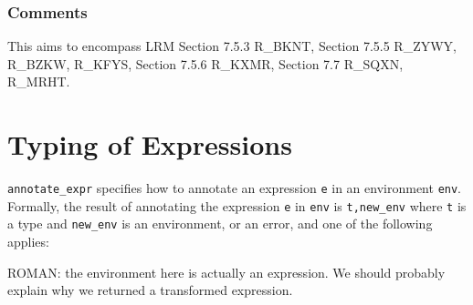 \documentclass{book}
\begin{document}
\subsection{Comments}
  This aims to encompass LRM Section 7.5.3 R\_BKNT, Section 7.5.5 R\_ZYWY, R\_BZKW,
  R\_KFYS, Section 7.5.6 R\_KXMR, Section 7.7 R\_SQXN, R\_MRHT.

\chapter{Typing of Expressions}

\texttt{annotate\_expr} specifies how to annotate an expression \texttt{e} in
an environment \texttt{env}.  Formally, the result of annotating the expression
\texttt{e} in \texttt{env} is \texttt{t,new\_env} where \texttt{t} is a type and
\texttt{new\_env} is an environment, or an error, and one of the following applies:
\begin{emptytodo}
ROMAN: the environment here is actually an expression. We should probably explain why we returned a transformed expression.
\end{emptytodo}
\end{document}
